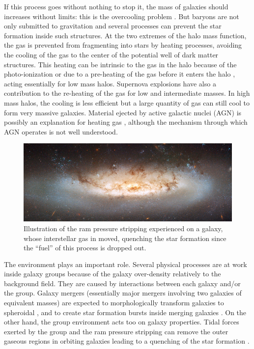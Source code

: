If this process goes without nothing to stop it, the mass of galaxies should
increases without limits: this is the overcooling problem \citep{White+78,
Blanchard+92}. But baryons are not only submitted to gravitation and several
processes can prevent the star formation inside such structures. At the two
extremes of the halo mass function, the gas is prevented from fragmenting into
stars by heating processes, avoiding the cooling of the gas to the center of
the potential well of dark matter structures. This heating can be intrinsic to
the gas in the halo because of the photo-ionization \citep{Rees+86} or due to a
pre-heating of the gas before it enters the halo \citep{Borgani+01}, acting
essentially for low mass halos. Supernova explosions have also a contribution
to the re-heating of the gas \citep{Dekel+86, Efstathiou+00} for low and
intermediate masses. In high mass halos, the cooling is less efficient but a
large quantity of gas can still cool to form very massive galaxies. Material
ejected by active galactic nuclei (AGN) is possibly an explanation for heating
gas \citep{Silk+98}, although the mechanism through which AGN operates is not
well understood.
%
\begin{figure}[htb]
    \centering
    \includegraphics[width=\linewidth]{figures/introduction/rampressure.jpg}
    \caption{Illustration of the ram pressure stripping experienced on a
    galaxy, whose interstellar gas in moved, quenching the star formation since
the ``fuel'' of this process is dropped out.\label{fig:rampressure}}
\end{figure}

The environment plays an important role. Several physical processes are at work
inside galaxy groups because of the galaxy over-density relatively to the
background field. They are caused by interactions between each galaxy and/or
the group. Galaxy mergers (essentially major mergers involving two galaxies of
equivalent masses) are expected to morphologically transform galaxies to
spheroidal \citep{Naab+99,Bournaud+05, Mamon+92}, and to create star formation
bursts inside merging galaxies \citep{Cox+08,Teyssier+10}. On the other hand,
the group environment acts too on galaxy properties. Tidal forces exerted by
the group and the ram pressure stripping can remove the outer gaseous regions
in orbiting galaxies leading to a quenching of the star formation
\citep{Larson+80,Bekki+14}.

